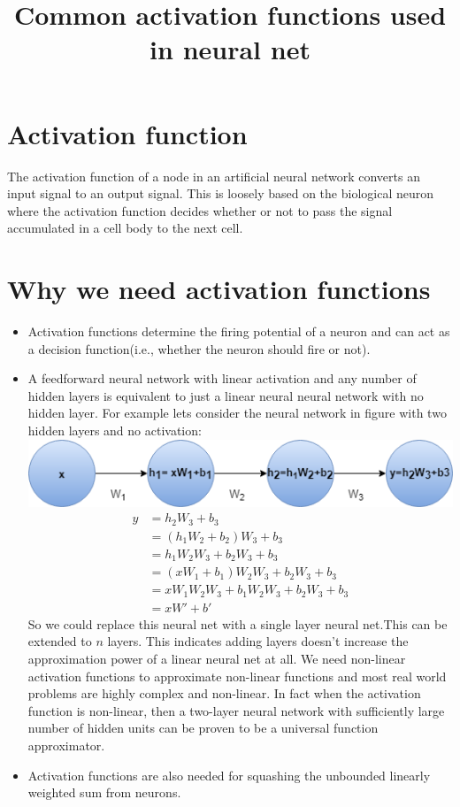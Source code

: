 \documentclass{article}
\title{Common activation functions used in neural net}
\author{}
\date{}
\begin{document}
\maketitle

\section*{Activation function}
The activation function of a node in an artificial neural network converts an input signal to an output signal. This is loosely based on the biological neuron where the activation function decides whether or not to pass the signal accumulated in a cell body to the next cell.


\section*{Why we need activation functions}

\begin{itemize}
    \item Activation functions determine the firing potential of a neuron and can act as a decision function(i.e., whether the neuron should fire or not).
    \item  A feedforward neural network with linear activation and any number of hidden layers is equivalent to just a linear neural neural network with no hidden layer. For example lets consider the neural network in figure with two hidden layers and no activation:\\
    \includegraphics[scale=0.75, center]{neural_net_three_layers.png}
    \begin{align*}
        y &= h_2 W_3 + b_3 \\
          &= (h_1 W_2 + b_2) W_3 + b_3 \\
          &= h_1 W_2 W_3 + b_2 W_3 + b_3 \\
          &= (x W_1 + b_1) W_2 W_3 + b_2 W_3 + b_3 \\
          &= x W_1 W_2 W_3 + b_1 W_2 W_3 + b_2 W_3 + b_3 \\
          &= x W' + b'
    \end{align*}
    So we could replace this neural net with a single layer neural net.This can be extended to $n$ layers. This indicates adding layers doesn't increase the approximation power of a linear neural net at all. We need non-linear activation functions to approximate non-linear functions and most real world problems are highly complex and non-linear. In fact when the activation function is non-linear, then a two-layer neural network with sufficiently large number of hidden units can be proven to be a universal function approximator.
    \item Activation functions are also needed for squashing the unbounded linearly weighted sum from neurons.
\end{itemize}
\end{document}
